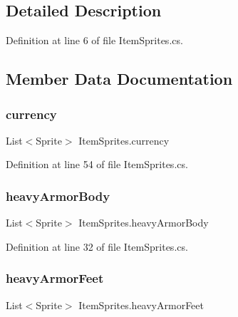 \subsection{Detailed Description}


Definition at line 6 of file Item\+Sprites.\+cs.



\subsection{Member Data Documentation}
\mbox{\label{class_item_sprites_aab1c64fdbd622d824d45fafcfd214ff6}} 
\subsubsection{\texorpdfstring{currency}{currency}}
{\footnotesize\ttfamily List$<$Sprite$>$ Item\+Sprites.\+currency}



Definition at line 54 of file Item\+Sprites.\+cs.

\mbox{\label{class_item_sprites_a0f591387be8cc87947f8e63983b1f457}} 
\subsubsection{\texorpdfstring{heavyArmorBody}{heavyArmorBody}}
{\footnotesize\ttfamily List$<$Sprite$>$ Item\+Sprites.\+heavy\+Armor\+Body}



Definition at line 32 of file Item\+Sprites.\+cs.

\mbox{\label{class_item_sprites_acb4b6688d9157be764e77fbcdfb3979f}} 
\subsubsection{\texorpdfstring{heavyArmorFeet}{heavyArmorFeet}}
{\footnotesize\ttfamily List$<$Sprite$>$ Item\+Sprites.\+heavy\+Armor\+Feet}



